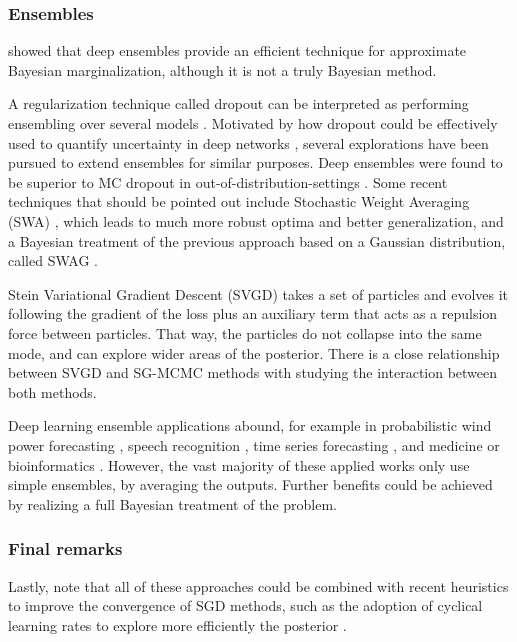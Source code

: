 \subsubsection{Ensembles} \cite{bdl} showed that deep ensembles \cite{ensemble} provide an efficient technique for approximate Bayesian marginalization, although it is not a truly Bayesian method.

A regularization technique called dropout can be interpreted as performing ensembling over several models \cite{dropout}. Motivated by how dropout could be effectively used to quantify uncertainty in deep networks \cite{pmlr-v48-gal16}, several explorations have been pursued to extend ensembles for similar purposes. Deep ensembles were found to be superior to MC dropout in out-of-distribution-settings \cite{Ovadia2019CanYT}.
Some recent techniques that should be pointed out include
Stochastic Weight Averaging (SWA) \cite{izmailov2018averaging}, which leads to much more robust optima and better generalization, and a Bayesian treatment of the previous approach based on a Gaussian distribution,
called SWAG \cite{NEURIPS2019_118921ef}.

Stein Variational Gradient Descent (SVGD) \cite{svgd} takes a set of particles and evolves it following the gradient of the loss plus an auxiliary term that acts as a repulsion force between particles. That
way, the particles do not collapse into the same mode, and can explore wider areas of the posterior. There is a close relationship between SVGD and SG-MCMC methods with \cite{gallego2018stochastic} 
studying the interaction between both methods.

Deep learning ensemble applications abound, for example in probabilistic wind power forecasting \cite{wang2017deep}, speech recognition \cite{deng2014ensemble}, time series forecasting \cite{qiu2014ensemble}, and medicine or bioinformatics \cite{qummar2019deep,xiao2018deep,cao2020ensemble}. However, the vast majority of these applied works only use simple ensembles, by averaging the outputs. Further benefits could be achieved by realizing a full Bayesian treatment of the problem.


\subsubsection{Final remarks}
Lastly, note that all of these approaches could be combined with recent heuristics to improve the convergence of SGD methods, such as the adoption of cyclical learning rates to explore more efficiently the posterior  \cite{7926641}.


